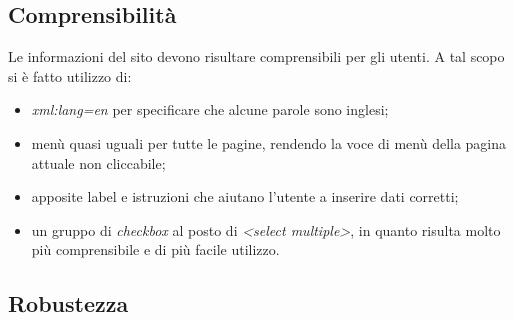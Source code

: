 \subsection{Comprensibilità}
Le informazioni del sito devono risultare comprensibili per gli utenti. A tal scopo si è fatto utilizzo di:
	\begin{itemize}
		\item \textit{xml:lang=en} per specificare che alcune parole sono inglesi;
		\item menù quasi uguali per tutte le pagine, rendendo la voce di menù della pagina attuale non cliccabile;
		\item apposite label e istruzioni che aiutano l'utente a inserire dati corretti;
		\item un gruppo di \textit{checkbox} al posto di \textit{<select multiple>}, in quanto risulta molto più comprensibile e di più facile utilizzo.
	\end{itemize}
\subsection{Robustezza}